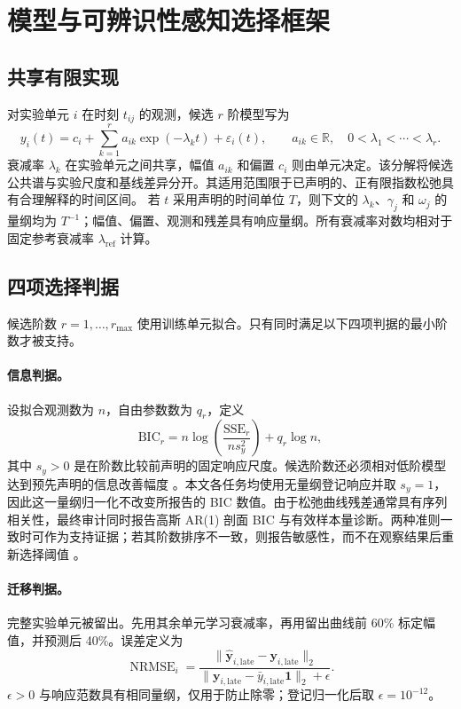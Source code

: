 \documentclass[UTF8,11pt]{ctexart}
\newcommand{\nrmse}{\operatorname{NRMSE}}
\begin{document}
\section{模型与可辨识性感知选择框架}
\subsection{共享有限实现}
对实验单元 $i$ 在时刻 $t_{ij}$ 的观测，候选 $r$ 阶模型写为
\begin{equation}
y_i(t)=c_i+\sum_{k=1}^{r}a_{ik}\exp(-\lambda_k t)+\varepsilon_i(t),
\qquad a_{ik}\in\mathbb R,\quad 0<\lambda_1<\cdots<\lambda_r.
\label{eq:model-zh}
\end{equation}
衰减率 $\lambda_k$ 在实验单元之间共享，幅值 $a_{ik}$ 和偏置 $c_i$ 则由单元决定。该分解将候选公共谱与实验尺度和基线差异分开。其适用范围限于已声明的、正有限指数松弛具有合理解释的时间区间。
若 $t$ 采用声明的时间单位 $T$，则下文的 $\lambda_k$、$\gamma_j$ 和 $\omega_j$ 的量纲均为 $T^{-1}$；幅值、偏置、观测和残差具有响应量纲。所有衰减率对数均相对于固定参考衰减率 $\lambda_{\mathrm{ref}}$ 计算。

\subsection{四项选择判据}
候选阶数 $r=1,\ldots,r_{\max}$ 使用训练单元拟合。只有同时满足以下四项判据的最小阶数才被支持。

\paragraph{信息判据。} 设拟合观测数为 $n$，自由参数数为 $q_r$，定义
\begin{equation}
\mathrm{BIC}_r=n\log\!\left(\frac{\mathrm{SSE}_r}{n s_y^2}\right)+q_r\log n,
\end{equation}
其中 $s_y>0$ 是在阶数比较前声明的固定响应尺度。候选阶数还必须相对低阶模型达到预先声明的信息改善幅度 \cite{schwarz1978bic}。本文各任务均使用无量纲登记响应并取 $s_y=1$，因此这一量纲归一化不改变所报告的 BIC 数值。由于松弛曲线残差通常具有序列相关性，最终审计同时报告高斯 AR(1) 剖面 BIC 与有效样本量诊断。两种准则一致时可作为支持证据；若其阶数排序不一致，则报告敏感性，而不在观察结果后重新选择阈值 \cite{hurvich1989timeseries}。

\paragraph{迁移判据。} 完整实验单元被留出。先用其余单元学习衰减率，再用留出曲线前 60\% 标定幅值，并预测后 40\%。误差定义为
\begin{equation}
\nrmse_i=\frac{\|\hat{\mathbf y}_{i,\mathrm{late}}-\mathbf y_{i,\mathrm{late}}\|_2}
{\|\mathbf y_{i,\mathrm{late}}-\bar y_{i,\mathrm{late}}\mathbf 1\|_2+\epsilon}.
\end{equation}
$\epsilon>0$ 与响应范数具有相同量纲，仅用于防止除零；登记归一化后取 $\epsilon=10^{-12}$。
\end{document}
